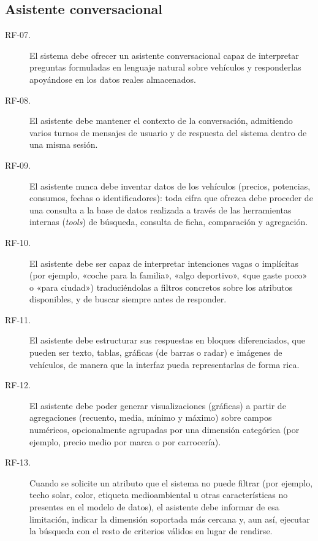 \subsection{Asistente conversacional}

\begin{description}
  \item[RF-07.] El sistema debe ofrecer un asistente conversacional capaz de
        interpretar preguntas formuladas en lenguaje natural sobre vehículos y
        responderlas apoyándose en los datos reales almacenados.

  \item[RF-08.] El asistente debe mantener el contexto de la conversación,
        admitiendo varios turnos de mensajes de usuario y de respuesta del
        sistema dentro de una misma sesión.

  \item[RF-09.] El asistente nunca debe inventar datos de los vehículos
        (precios, potencias, consumos, fechas o identificadores): toda cifra
        que ofrezca debe proceder de una consulta a la base de datos realizada
        a través de las herramientas internas (\emph{tools}) de búsqueda,
        consulta de ficha, comparación y agregación.

  \item[RF-10.] El asistente debe ser capaz de interpretar intenciones vagas o
        implícitas (por ejemplo, «coche para la familia», «algo deportivo»,
        «que gaste poco» o «para ciudad») traduciéndolas a filtros concretos
        sobre los atributos disponibles, y de buscar siempre antes de
        responder.

  \item[RF-11.] El asistente debe estructurar sus respuestas en bloques
        diferenciados, que pueden ser texto, tablas, gráficas (de barras o
        radar) e imágenes de vehículos, de manera que la interfaz pueda
        representarlas de forma rica.

  \item[RF-12.] El asistente debe poder generar visualizaciones (gráficas)
        a partir de agregaciones (recuento, media, mínimo y máximo) sobre
        campos numéricos, opcionalmente agrupadas por una dimensión categórica
        (por ejemplo, precio medio por marca o por carrocería).

  \item[RF-13.] Cuando se solicite un atributo que el sistema no puede filtrar
        (por ejemplo, techo solar, color, etiqueta medioambiental u otras
        características no presentes en el modelo de datos), el asistente debe
        informar de esa limitación, indicar la dimensión soportada más cercana
        y, aun así, ejecutar la búsqueda con el resto de criterios válidos en
        lugar de rendirse.


\end{description}
